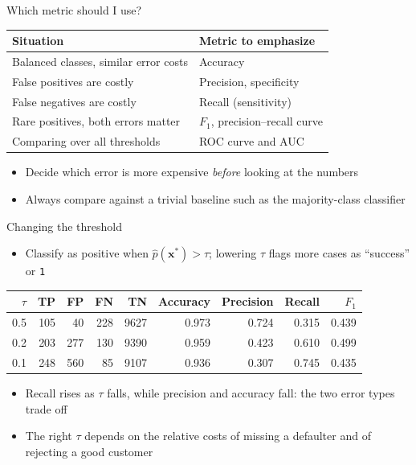 \begin{frame}{Which metric should I use?}
    \begin{center}
        \small
        \begin{tabular}{@{}l@{\hspace{1.5em}}l@{}}
            \toprule
            Situation & Metric to emphasize \\
            \midrule
            Balanced classes, similar error costs & Accuracy \\
            False positives are costly & Precision, specificity \\
            False negatives are costly & Recall (sensitivity) \\
            Rare positives, both errors matter & $F_1$, precision--recall curve \\
            Comparing over all thresholds & ROC curve and AUC \\
            \bottomrule
        \end{tabular}
    \end{center}
    \begin{itemize}
        \item Decide which error is more expensive \emph{before} looking at the numbers
        \item Always compare against a trivial baseline such as the majority-class classifier
    \end{itemize}
\end{frame}


\begin{frame}{Changing the threshold}
    \begin{itemize}
        \item Classify as positive when $\hat{p}(\mathbf{x}^\ast) > \tau$; lowering $\tau$ flags more cases as ``success'' or \texttt{1}
    \end{itemize}
    \begin{center}
        \footnotesize
        \begin{tabular}{rrrrrrrrr}
            \toprule
            $\tau$ & TP & FP & FN & TN & Accuracy & Precision & Recall & $F_1$ \\
            \midrule
            0.5 & 105 &  40 & 228 & 9627 & 0.973 & 0.724 & 0.315 & 0.439 \\
            0.2 & 203 & 277 & 130 & 9390 & 0.959 & 0.423 & 0.610 & 0.499 \\
            0.1 & 248 & 560 &  85 & 9107 & 0.936 & 0.307 & 0.745 & 0.435 \\
            \bottomrule
        \end{tabular}
    \end{center}
    \begin{itemize}
        \item Recall rises as $\tau$ falls, while precision and accuracy fall: the two error types trade off
        \item The right $\tau$ depends on the relative costs of missing a defaulter and of rejecting a good customer
    \end{itemize}
\end{frame}


